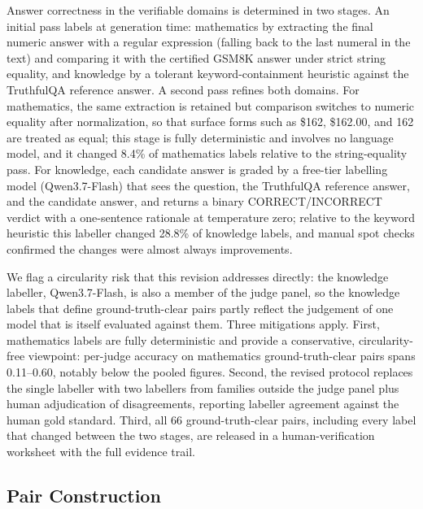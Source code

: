 \documentclass[review,12pt]{elsarticle}
\begin{document}
Answer correctness in the verifiable domains is determined in two stages.
An initial pass labels at generation time: mathematics by extracting the
final numeric answer with a regular expression (falling back to the last
numeral in the text) and comparing it with the certified GSM8K answer
under strict string equality, and knowledge by a tolerant
keyword-containment heuristic against the TruthfulQA reference answer. A
second pass refines both domains. For mathematics, the same extraction is
retained but comparison switches to numeric equality after normalization,
so that surface forms such as \$162, \$162.00, and 162 are treated as
equal; this stage is fully deterministic and involves no language model,
and it changed 8.4\% of mathematics labels relative to the string-equality
pass. For knowledge, each candidate answer is graded by a free-tier
labelling model (Qwen3.7-Flash) that sees the question, the TruthfulQA
reference answer, and the candidate answer, and returns a binary
CORRECT/INCORRECT verdict with a one-sentence rationale at temperature
zero; relative to the keyword heuristic this labeller changed 28.8\% of
knowledge labels, and manual spot checks confirmed the changes were
almost always improvements.

We flag a circularity risk that this revision addresses directly: the
knowledge labeller, Qwen3.7-Flash, is also a member of the judge panel,
so the knowledge labels that define ground-truth-clear pairs partly
reflect the judgement of one model that is itself evaluated against them.
Three mitigations apply. First, mathematics labels are fully deterministic
and provide a conservative, circularity-free viewpoint: per-judge accuracy
on mathematics ground-truth-clear pairs spans 0.11--0.60, notably below
the pooled figures. Second, the revised protocol replaces the single
labeller with two labellers from families outside the judge panel plus
human adjudication of disagreements, reporting labeller agreement against
the human gold standard. Third, all 66 ground-truth-clear pairs, including
every label that changed between the two stages, are released in a
human-verification worksheet with the full evidence trail.

\subsection{Pair Construction}
\label{sec:pairs}
\end{document}
